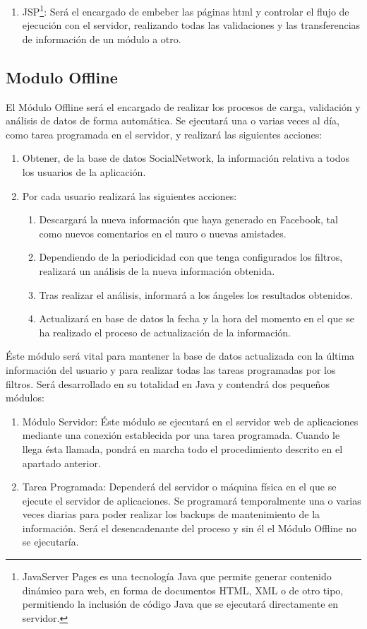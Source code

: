 \begin{enumerate}
\item JSP\footnote[6]{JavaServer Pages es una tecnología Java que permite generar contenido dinámico para web, en forma de documentos HTML, XML o de otro tipo, permitiendo la inclusión de código Java que se ejecutará directamente en servidor.}: Será el encargado de embeber las páginas html y controlar el flujo de ejecución con el servidor, realizando todas las validaciones y las transferencias de información de un módulo a otro.
\end{enumerate}

\subsection{Modulo Offline}
El Módulo Offline será el encargado de realizar los procesos de carga, validación y análisis de datos de forma automática. Se ejecutará una o varias veces al día, como tarea programada en el servidor, y realizará las siguientes acciones:
\begin{enumerate}
\item Obtener, de la base de datos SocialNetwork, la información relativa a todos los usuarios de la aplicación.
\item Por cada usuario realizará las siguientes acciones:
\begin{enumerate}
\item Descargará la nueva información que haya generado en Facebook, tal como nuevos comentarios en el muro o nuevas amistades.
\item Dependiendo de la periodicidad con que tenga configurados los filtros, realizará un análisis de la nueva información obtenida.
\item Tras realizar el análisis, informará a los ángeles los resultados obtenidos.
\item Actualizará en base de datos la fecha y la hora del momento en el que se ha realizado el proceso de actualización de la información.
\end{enumerate}
\end{enumerate}
\bigskip
\par 
Éste módulo será vital para mantener la base de datos actualizada con la última información del usuario y para realizar todas las tareas programadas por los filtros. Será desarrollado en su totalidad en Java y contendrá dos pequeños módulos:
\begin{enumerate}
\item Módulo Servidor: Éste módulo se ejecutará en el servidor web de aplicaciones mediante una conexión establecida por una tarea programada. Cuando le llega ésta llamada, pondrá en marcha todo el procedimiento descrito en el apartado anterior.
\item Tarea Programada: Dependerá del servidor o máquina física en el que se ejecute el servidor de aplicaciones. Se programará temporalmente una o varias veces diarias para poder realizar los backups de mantenimiento de la información. Será el desencadenante del proceso y sin él el Módulo Offline no se ejecutaría.
\end{enumerate} 